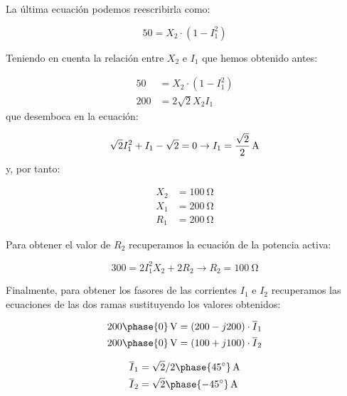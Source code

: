 \documentclass[12pt]{article}
\begin{document}
La última ecuación podemos reescribirla como:

\[
  50 = X_2 \cdot (1- I_1^2)
\]

Teniendo en cuenta la relación entre $X_2$ e $I_1$ que hemos obtenido antes:

\begin{align*}
  50 &= X_2 \cdot (1- I_1^2)\\
  200 &= 2\sqrt{2} X_2 I_1  
\end{align*}
que desemboca en la ecuación:

\[
\sqrt{2} I_1^2 + I_1 - \sqrt{2} = 0 \rightarrow I_1 =  \SI[parse-numbers=false]{\frac{\sqrt{2}}{2}}{\ampere}
\]
y, por tanto:

\begin{align*}
  X_2 &= \SI{100}{\ohm}\\
  X_1 &= \SI{200}{\ohm}\\
  R_1 &= \SI{200}{\ohm}
\end{align*}

Para obtener el valor de $R_2$ recuperamos la ecuación de la potencia activa:

\[
  300 = 2I_1^2 X_2 + 2 R_2 \rightarrow R_2 = \SI{100}{\ohm}
\]

Finalmente, para obtener los fasores de las corrientes $I_1$ e $I_2$ recuperamos las ecuaciones de las dos ramas sustituyendo los valores obtenidos:

\begin{align*}
   \SI[parse-numbers=false]{200\phase{0}}{\volt} &= (200 - j200) \cdot \overline{I}_1\\
   \SI[parse-numbers=false]{200\phase{0}}{\volt} &= (100 + j100) \cdot \overline{I}_2
\end{align*}

\begin{align*}
  \overline{I}_1 &= \SI[parse-numbers=false]{\sqrt{2}/2\phase{\ang{45}}}{\ampere}\\
  \overline{I}_2 &= \SI[parse-numbers=false]{\sqrt{2}\phase{\ang{-45}}}{\ampere}
\end{align*}

\clearpage

\section{}

\end{document}
